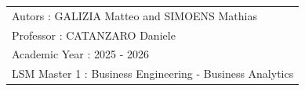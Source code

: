 \begin{titlepage}
\begin{tcolorbox}
        \begin{flushleft}
            {\selectfont \fontsize{12}{13}\selectfont \color{white} 
                \begin{tabular}{l}
                    Autors : GALIZIA Matteo and SIMOENS Mathias\\
                    Professor : CATANZARO Daniele\\
                    Academic Year : 2025 - 2026 \\
                    LSM Master 1 : Business Engineering - Business Analytics
                \end{tabular}
            }
        \end{flushleft}
    \end{tcolorbox}
\end{titlepage}